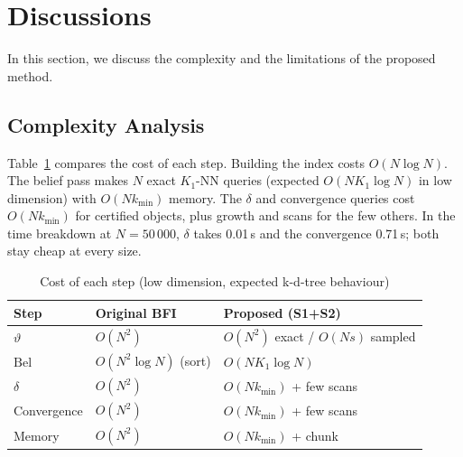 \documentclass[journal]{IEEEtran}
\newcommand{\Bel}{\mathrm{Bel}}
\begin{document}
\section{Discussions}\label{sec:disc}
In this section, we discuss the complexity and the limitations of the proposed method.

\subsection{Complexity Analysis}
Table~\ref{tab:complexity} compares the cost of each step. Building the index costs $O(N\log N)$. The belief pass makes $N$ exact $K_1$-NN queries (expected $O(NK_1\log N)$ in low dimension) with $O(Nk_{\min})$ memory. The $\delta$ and convergence queries cost $O(Nk_{\min})$ for certified objects, plus growth and scans for the few others. In the time breakdown at $N=50\,000$, $\delta$ takes 0.01\,s and the convergence 0.71\,s; both stay cheap at every size.

\begin{table}[!t]
\centering
\caption{Cost of each step (low dimension, expected k-d-tree behaviour)}
\label{tab:complexity}
\scriptsize
\begin{tabular}{lll}
\toprule
Step & Original BFI & Proposed (S1+S2) \\
\midrule
$\vartheta$ & $O(N^2)$ & $O(N^2)$ exact / $O(Ns)$ sampled \\
$\Bel$ & $O(N^2\log N)$ (sort) & $O(NK_1\log N)$ \\
$\delta$ & $O(N^2)$ & $O(Nk_{\min})$ + few scans \\
Convergence & $O(N^2)$ & $O(Nk_{\min})$ + few scans \\
Memory & $O(N^2)$ & $O(Nk_{\min})$ + chunk \\
\bottomrule
\end{tabular}
\end{table}
\end{document}
